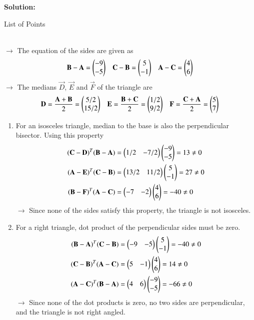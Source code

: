 \documentclass[journal]{IEEEtran}
\begin{document}
\textbf{Solution:}\\
\begin{table}[h!]    
  \centering
  
  \caption{List of Points}
  \label{Table_1}
\end{table} \\
$\rightarrow$ The equation of the sides are given as
\begin{align}
    \mathbf{B}-\mathbf{A}=\begin{pmatrix}-9\\-5\end{pmatrix} && \mathbf{C}-\mathbf{B}=\begin{pmatrix}5\\-1\end{pmatrix} && \mathbf{A}-\mathbf{C}=\begin{pmatrix}4\\6\end{pmatrix}
\end{align}
$\rightarrow$ The medians $\vec{D}$, $\vec{E}$ and $\vec{F}$ of the triangle are
\begin{align}
    \mathbf{D} = \frac{\mathbf{A}+\mathbf{B}}{2} = \begin{pmatrix}5/2\\15/2\end{pmatrix} &&
    \mathbf{E} = \frac{\mathbf{B}+\mathbf{C}}{2} = \begin{pmatrix}1/2\\9/2\end{pmatrix} &&
    \mathbf{F} = \frac{\mathbf{C}+\mathbf{A}}{2} = \begin{pmatrix}5\\7\end{pmatrix}
\end{align}
\begin{enumerate}[label=(\alph*)]
\item {
For an isosceles triangle, median to the base is also the perpendicular bisector. Using this property
\begin{align}
    (\mathbf{C}-\mathbf{D})^T(\mathbf{B}-\mathbf{A}) &= \begin{pmatrix}1/2&-7/2\end{pmatrix}\begin{pmatrix}-9\\-5\end{pmatrix} = 13 \neq 0 \\
    (\mathbf{A}-\mathbf{E})^T(\mathbf{C}-\mathbf{B}) &= \begin{pmatrix}13/2&11/2\end{pmatrix}\begin{pmatrix}5\\-1\end{pmatrix} = 27 \neq 0 \\
    (\mathbf{B}-\mathbf{F})^T(\mathbf{A}-\mathbf{C}) &= \begin{pmatrix}-7&-2\end{pmatrix}\begin{pmatrix}4\\6\end{pmatrix} = -40 \neq 0
\end{align}
$\rightarrow$ Since none of the sides satisfy this property, the triangle is not isosceles.
}
\item {
For a right triangle, dot product of the perpendicular sides must be zero.
\begin{align}
    (\mathbf{B}-\mathbf{A})^T(\mathbf{C}-\mathbf{B})&=\begin{pmatrix}-9&-5\end{pmatrix}\begin{pmatrix}5\\-1\end{pmatrix} = -40 \neq 0 \\
    (\mathbf{C}-\mathbf{B})^T(\mathbf{A}-\mathbf{C})&=\begin{pmatrix}5&-1\end{pmatrix}\begin{pmatrix}4\\6\end{pmatrix} = 14 \neq 0 \\
    (\mathbf{A}-\mathbf{C})^T(\mathbf{B}-\mathbf{A})&=\begin{pmatrix}4&6\end{pmatrix}\begin{pmatrix}-9\\-5\end{pmatrix} = -66 \neq 0
\end{align}
$\rightarrow$ Since none of the dot products is zero, no two sides are perpendicular, and the triangle is not right angled.
}
\end{enumerate}
\end{document}
